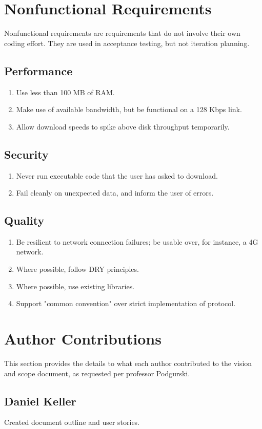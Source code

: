 \documentclass[letter]{scrartcl}
\begin{document}
\section{Nonfunctional Requirements}
Nonfunctional requirements are requirements that do not involve their own coding effort. They are used in acceptance testing, but not iteration planning. 
\subsection{Performance}
\begin{enumerate}
\item Use less than 100 MB of RAM.
\item Make use of available bandwidth, but be functional on a 128 Kbps link.
\item Allow download speeds to spike above disk throughput temporarily.
\end{enumerate}
\subsection{Security}
\begin{enumerate}
\item Never run executable code that the user has asked to download.
\item Fail cleanly on unexpected data, and inform the user of errors.
\end{enumerate}
\subsection{Quality}
\begin{enumerate}
\item Be resilient to network connection failures; be usable over, for instance, a 4G network.
\item Where possible, follow DRY principles.
\item Where possible, use existing libraries.
\item Support "common convention" over strict implementation of protocol.
\end{enumerate}
\pagebreak
\section{Author Contributions}
This section provides the details to what each author contributed to the vision and scope document, as requested per professor Podgurski.
\subsection{Daniel Keller}
Created document outline and user stories.
\end{document}

